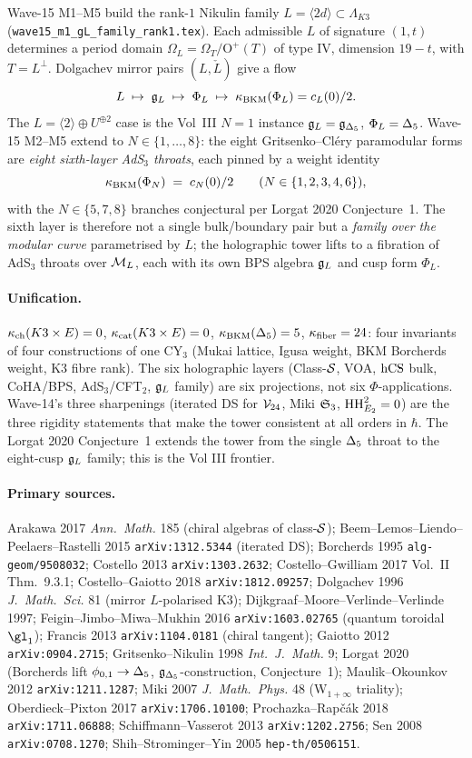 Wave-15 M1--M5 build the rank-$1$ Nikulin family
$L=\langle 2d\rangle\subset\Lambda_{K3}$
(\texttt{wave15\_m1\_gL\_family\_rank1.tex}).  Each admissible $L$
of signature $(1,t)$ determines a period domain
$\Omega_L=\Omega_{T}/\mathrm{O}^{+}(T)$ of type IV, dimension
$19-t$, with $T=L^\perp$.  Dolgachev mirror pairs $(L,\check L)$
give a flow
\[
  L\;\mapsto\;\mathfrak{g}_{L}\;\mapsto\;\Phi_L\;\mapsto\;\kappa_{\mathrm{BKM}}(\Phi_L)=c_L(0)/2.
\]
The $L=\langle 2\rangle\oplus U^{\oplus 2}$ case is the Vol~III
$N=1$ instance $\mathfrak{g}_{L}=\mathfrak{g}_{\Delta_5}$, $\Phi_L=\Delta_{5}$.  Wave-15 M2--M5
extend to $N\in\{1,\dots,8\}$: the eight Gritsenko--Cl\'ery
paramodular forms are \emph{eight sixth-layer AdS$_3$ throats},
each pinned by a weight identity
\[
  \kappa_{\mathrm{BKM}}(\Phi_N)\;=\;c_N(0)/2\qquad(N\in\{1,2,3,4,6\}),
\]
with the $N\in\{5,7,8\}$ branches conjectural per Lorgat 2020
Conjecture~1.  The sixth layer is therefore not a single bulk/boundary
pair but a \emph{family over the modular curve} parametrised by
$L$; the holographic tower lifts to a fibration of AdS$_3$ throats
over $\mathcal{M}_L$, each with its own BPS algebra $\mathfrak{g}_{L}$ and cusp form
$\Phi_L$.

\paragraph{Unification.}
$\kappa_{\mathrm{ch}}(K3\times E)=0$, $\kappa_{\mathrm{cat}}(K3\times E)=0$,
$\kappa_{\mathrm{BKM}}(\Delta_{5})=5$, $\kappa_{\mathrm{fiber}}=24$: four invariants of four
constructions of one CY$_3$ (Mukai lattice, Igusa weight, BKM
Borcherds weight, K3 fibre rank).  The six holographic layers
(Class-$\mathcal{S}$, VOA, $\mathrm{hCS}$ bulk, CoHA/BPS, AdS$_3$/CFT$_2$, $\mathfrak{g}_{L}$
family) are six projections, not six $\Phi$-applications.  Wave-14's
three sharpenings (iterated DS for $\mathcal{V}_{24}$, Miki $\mathfrak{S}_{3}$,
$\mathrm{HH}^2_{E_2}=0$) are the three rigidity statements that make the
tower consistent at all orders in $\hbar$.  The Lorgat 2020
Conjecture~1 extends the tower from the single $\Delta_{5}$
throat to the eight-cusp $\mathfrak{g}_{L}$ family; this is the Vol III frontier.

\paragraph{Primary sources.}
Arakawa 2017 \emph{Ann.\ Math.} 185 (chiral algebras of
class-$\mathcal{S}$);
Beem--Lemos--Liendo--Peelaers--Rastelli 2015
\texttt{arXiv:1312.5344} (iterated DS);
Borcherds 1995 \texttt{alg-geom/9508032};
Costello 2013 \texttt{arXiv:1303.2632};
Costello--Gwilliam 2017 Vol.~II Thm.~9.3.1;
Costello--Gaiotto 2018 \texttt{arXiv:1812.09257};
Dolgachev 1996 \emph{J.\ Math.\ Sci.} 81 (mirror $L$-polarised K3);
Dijkgraaf--Moore--Verlinde--Verlinde 1997;
Feigin--Jimbo--Miwa--Mukhin 2016 \texttt{arXiv:1603.02765}
(quantum toroidal $\gl_1$);
Francis 2013 \texttt{arXiv:1104.0181} (chiral tangent);
Gaiotto 2012 \texttt{arXiv:0904.2715};
Gritsenko--Nikulin 1998 \emph{Int.\ J.\ Math.} 9;
Lorgat 2020 (Borcherds lift $\phi_{0,1}\to\Delta_{5}$,
$\mathfrak{g}_{\Delta_5}$-construction, Conjecture~1);
Maulik--Okounkov 2012 \texttt{arXiv:1211.1287};
Miki 2007 \emph{J.\ Math.\ Phys.} 48 (W$_{1+\infty}$ triality);
Oberdieck--Pixton 2017 \texttt{arXiv:1706.10100};
Prochazka--Rap{\v c}{\'a}k 2018 \texttt{arXiv:1711.06888};
Schiffmann--Vasserot 2013 \texttt{arXiv:1202.2756};
Sen 2008 \texttt{arXiv:0708.1270};
Shih--Strominger--Yin 2005 \texttt{hep-th/0506151}.
